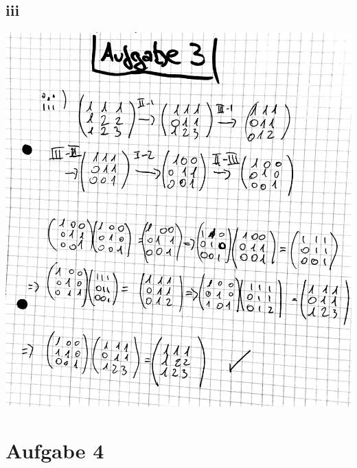 \documentclass[12pt,a4paper]{article}
\begin{document}
\subsection{iii}
\includegraphics[scale=0.2]{lat4g_1.jpg} 

\newpage
\section{Aufgabe 4}
\end{document}
